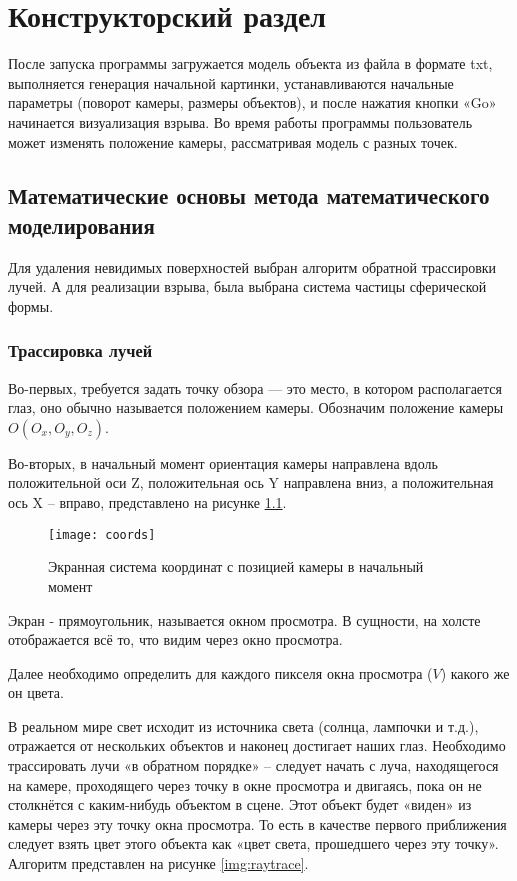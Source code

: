 \chapter{\textbf{Конструкторский раздел}}

\hfill

После запуска программы загружается модель объекта из файла в формате txt, выполняется генерация начальной картинки, устанавливаются начальные параметры (поворот камеры, размеры объектов), и после нажатия кнопки «Go» начинается визуализация взрыва. Во время работы программы пользователь может изменять положение камеры, рассматривая модель с разных точек. 

\section{\textbf{Математические основы метода математического моделирования}}

\hfill

Для удаления невидимых поверхностей выбран алгоритм обратной трассировки лучей. А для реализации взрыва, была выбрана система частицы сферической формы. 

\subsection{\textbf{Трассировка лучей}}

\hfill

Во-первых, требуется задать точку обзора — это место, в котором располагается глаз, оно обычно называется положением камеры. Обозначим положение камеры $O(O_x, O_y, O_z)$. 

Во-вторых, в начальный момент ориентация камеры направлена вдоль положительной оси Z, положительная ось Y направлена вниз, а положительная ось X -- вправо, представлено на рисунке \ref{img:coords}. 

\begin{figure}[H]
	\centering
	\texttt{[image: coords]}
	\caption{Экранная система координат с позицией камеры в начальный момент}
	\label{img:coords}
\end{figure}

Экран - прямоугольник, называется окном просмотра. В сущности, на холсте отображается всё то, что видим через окно просмотра.

Далее необходимо определить для каждого пикселя окна просмотра ($V$) какого же он цвета.

В реальном мире свет исходит из источника света (солнца, лампочки и т.д.), отражается от нескольких объектов и наконец достигает наших глаз. Необходимо трассировать лучи «в обратном порядке» -- следует начать с луча, находящегося на камере, проходящего через точку в окне просмотра и двигаясь, пока он не столкнётся с каким-нибудь объектом в сцене. Этот объект будет «виден» из камеры через эту точку окна просмотра. То есть в качестве первого приближения следует взять цвет этого объекта как «цвет света, прошедшего через эту точку».
Алгоритм представлен на рисунке \ref{img:raytrace}. 

